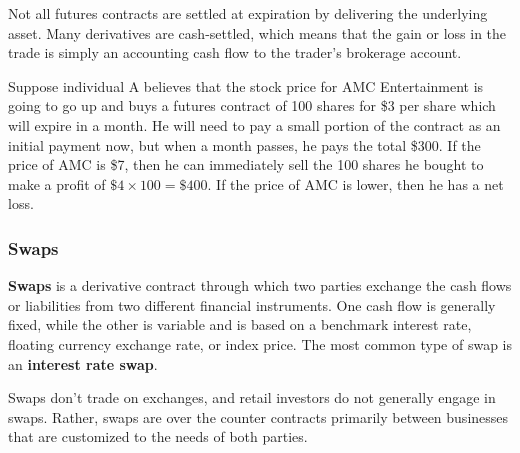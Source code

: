 \documentclass{article}
\begin{document}
      Not all futures contracts are settled at expiration by delivering the underlying asset. Many derivatives are cash-settled, which means that the gain or loss in the trade is simply an accounting cash flow to the trader's brokerage account. 

      \begin{example}
        Suppose individual A believes that the stock price for AMC Entertainment is going to go up and buys a futures contract of 100 shares for \$3 per share which will expire in a month. He will need to pay a small portion of the contract as an initial payment now, but when a month passes, he pays the total \$300. If the price of AMC is \$7, then he can immediately sell the 100 shares he bought to make a profit of $\$4 \times 100 = \$400$. If the price of AMC is lower, then he has a net loss. 
      \end{example}

    \subsubsection{Swaps}

      \begin{definition}
        \textbf{Swaps} is a derivative contract through which two parties exchange the cash flows or liabilities from two different financial instruments. One cash flow is generally fixed, while the other is variable and is based on a benchmark interest rate, floating currency exchange rate, or index price. The most common type of swap is an \textbf{interest rate swap}. 

        Swaps don't trade on exchanges, and retail investors do not generally engage in swaps. Rather, swaps are over the counter contracts primarily between businesses that are customized to the needs of both parties. 
      \end{definition}
\end{document}
